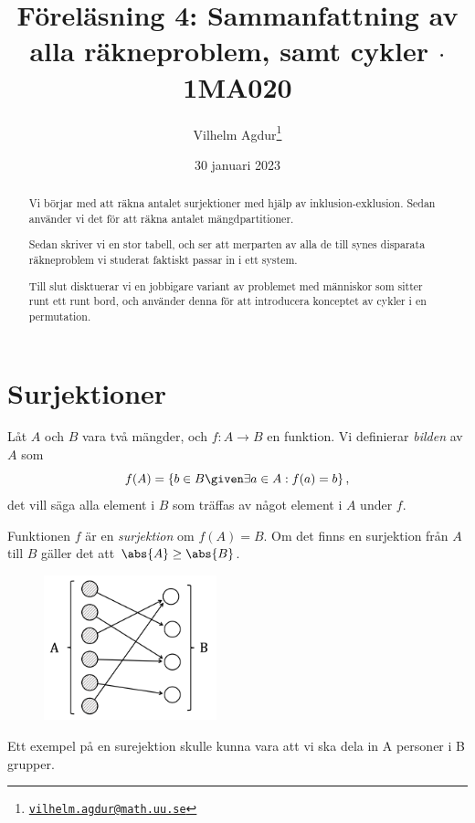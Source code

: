 \documentclass[nobib]{tufte-handout}
\title{Föreläsning 4: Sammanfattning av alla räkneproblem, samt cykler $\cdot$ 1MA020}
\author[Vilhelm Agdur]{Vilhelm Agdur\thanks{\href{mailto:vilhelm.agdur@math.uu.se}{\nolinkurl{vilhelm.agdur@math.uu.se}}}}
\date{30 januari 2023}
\begin{document}

\maketitle%

\begin{abstract}
\noindent
Vi börjar med att räkna antalet surjektioner med hjälp av inklusion-exklusion. Sedan använder vi det för att räkna antalet mängdpartitioner.

Sedan skriver vi en stor tabell, och ser att merparten av alla de till synes disparata räkneproblem vi studerat faktiskt passar in i ett system.

Till slut disktuerar vi en jobbigare variant av problemet med människor som sitter runt ett runt bord, och använder denna för att introducera konceptet av cykler i en permutation.
\end{abstract}

\section{Surjektioner}

\begin{definition}
  Låt $A$ och $B$ vara två mängder, och $f: A \to B$ en funktion. Vi definierar \emph{bilden} av $A$ som
  $$f(A) = \left\{b \in B \given \exists a\in A: f(a) = b\right\},$$
  det vill säga alla element i $B$ som träffas av något element i $A$ under $f$.

  Funktionen $f$ är en \emph{surjektion} om $f(A) = B$. Om det finns en surjektion från $A$ till $B$ gäller det att $\abs{A} \geq \abs{B}$.

\begin{figure}[h]
\includegraphics[width=50mm]{surjektioner.png}
\end{figure}
Ett exempel på en surejektion skulle kunna vara att vi ska dela in A personer i B grupper.
  
\end{definition}
\end{document}
